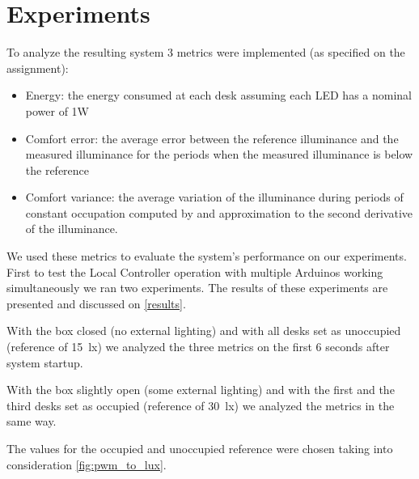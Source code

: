 \section{Experiments}

To analyze the resulting system 3 metrics were implemented (as specified on the assignment):
\begin{itemize}
    \item Energy: the energy consumed at each desk assuming each LED has a nominal power of 1W

    \item Comfort error: the average error between the reference illuminance and the measured
illuminance for the periods when the measured illuminance is below the reference

    \item Comfort variance: the average variation of the illuminance during periods of constant occupation computed by and approximation to the second derivative of the illuminance.
\end{itemize}

We used these metrics to evaluate the system's performance on our experiments. First to test the Local Controller operation with multiple Arduinos working simultaneously we ran two experiments. The results of these experiments are presented and discussed on \autoref{results}.

With the box closed (no external lighting) and with all desks set as unoccupied (reference of \SI{15}{\lux}) we analyzed the three metrics on the first 6 seconds after system startup.

With the box slightly open (some external lighting) and with the first and the third desks set as occupied (reference of \SI{30}{\lux}) we analyzed the metrics in the same way.

The values for the occupied and unoccupied reference were chosen taking into consideration \autoref{fig:pwm_to_lux}.
